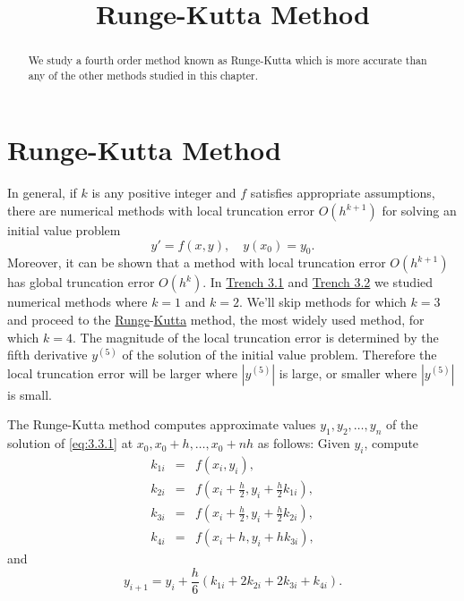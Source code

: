 \documentclass{ximera}
\title{Runge-Kutta Method}
\begin{document}

\begin{abstract}
We study a fourth order method known as Runge-Kutta which is more accurate than any of the other methods studied in this chapter.
\end{abstract}

\maketitle

\section*{Runge-Kutta Method}

In general, if $k$ is any  positive  integer  and $f$
satisfies appropriate assumptions, there are numerical methods with
local truncation error  $O(h^{k+1})$ for solving an initial value
problem
\begin{equation} \label{eq:3.3.1}
y'=f(x,y),\quad y(x_0)=y_0.
\end{equation}
Moreover, it can be shown that a method with local truncation error
$O(h^{k+1})$ has global truncation error $O(h^k)$. In
\href{https://ximera.osu.edu/ode/main/eulersMethod/eulersMethod}{Trench 3.1} and \href{https://ximera.osu.edu/ode/main/improvedEuler/improvedEuler}{Trench 3.2} we studied numerical
methods where
$k=1$ and $k=2$. We'll skip methods for which $k=3$ and proceed to the
\href{http://www-history.mcs.st-and.ac.uk/Mathematicians/Runge.html}
{Runge}-\href{http://www-history.mcs.st-and.ac.uk/Mathematicians/Kutta.html}{Kutta} method, the most widely used
method, for which $k=4$. The magnitude of the local truncation error is
determined by the fifth derivative $y^{(5)}$ of the solution of the
initial value problem. Therefore the local truncation error will be
larger where $|y^{(5)}|$ is large, or smaller where $|y^{(5)}|$ is
small.

The Runge-Kutta method computes approximate values
$y_1, y_2, \dots, y_n$ of the solution of \eqref{eq:3.3.1}
at $x_0, x_0+h, \dots, x_0+nh$ as follows: Given $y_i$,
compute
\begin{eqnarray*} k_{1i}&=&f(x_i,y_i),\\
k_{2i}&=&f\left(x_i+\frac{h}{2},y_i+\frac{h}{2}k_{1i}\right),\\
k_{3i}&=&f\left(x_i+\frac{h}{2},y_i+\frac{h}{2}k_{2i}\right),\\
k_{4i}&=&f(x_i+h,y_i+hk_{3i}),
\end{eqnarray*}
and
$$
y_{i+1}=y_i+\frac{h}{6}(k_{1i}+2k_{2i}+2k_{3i}+k_{4i}).
$$
\end{document}
